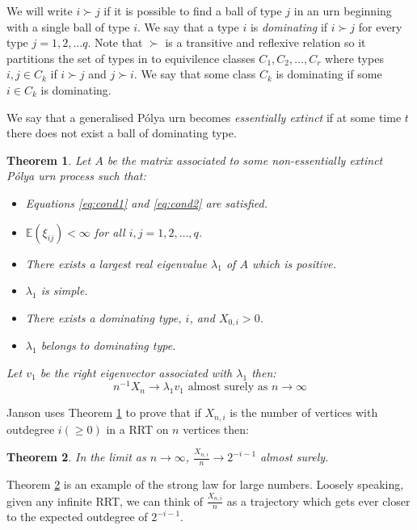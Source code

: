 \documentclass[8pt]{article} %
\newtheorem{theorem}{Theorem}
\theoremstyle{definition}
\begin{document}
We will write $i\succ j$ if it is possible to find a ball of type $j$ in an urn beginning with a single ball of type $i$.  We say that a type $i$ is \emph{dominating} if $i\succ j$ for every type $j = 1,2,\dots q$. Note that $\succ$ is a transitive and reflexive relation so it partitions the set of types in to equivilence classes $C_1,C_2,\dots , C_r$ where types $i,j \in C_k$ if $i\succ j$ and $j\succ i$.  We say that some class $C_k$ is dominating if some $i \in C_k$ is dominating.

We say that a generalised P\'{o}lya urn becomes \emph{essentially extinct} if at some time $t$ there does not exist a ball of dominating type.  

      

\begin{theorem}\label{thm:3.21}
 Let $A$ be the matrix associated to some non-essentially extinct P\'{o}lya urn process such that:
 \begin{itemize}
  \item[(A1)] Equations \ref{eq:cond1} and \ref{eq:cond2} are satisfied.
  \item[(A2)] $\mathbb{E}(\xi_{ij}) < \infty$ for all $i,j  = 1,2,\dots, q$.
  \item[(A3)] There exists a largest real eigenvalue $\lambda_{1}$ of $A$ which is positive.
  \item[(A4)] $\lambda_1$ is simple.
  \item[(A5)] There exists a dominating type, $i$, and $X_{0,i} > 0$.
  \item[(A6)] $\lambda_{1}$ belongs to dominating type.  
 \end{itemize}
Let $v_{1}$ be the right eigenvector associated with $\lambda_1$ then:
\[n^{-1}X_{n} \rightarrow \lambda_{1}v_{1} \text{   almost surely as   } n \rightarrow\infty\]
\end{theorem}

Janson uses Theorem \ref{thm:3.21} to prove that if $X_{n,i}$ is the number of vertices with outdegree $i(\geq 0 )$ in a RRT on $n$ vertices then:

\begin{theorem}\label{thm:3.1}
 In the limit as $n\rightarrow\infty$, $\frac{X_{n,i}}{n} \rightarrow 2^{-i-1}$ almost surely.
\end{theorem}
Theorem \ref{thm:3.1}  is an example of the strong law for large numbers.  Loosely speaking, given any infinite RRT, we can think of $\frac{X_{n,i}}{n}$ as a trajectory which gets ever closer to the expected outdegree of $2^{-i-1}$. 
\end{document}
